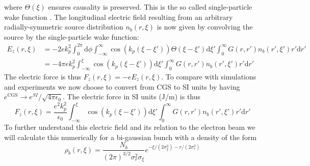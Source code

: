where $\Theta(\xi)$ ensures causality is preserved. This is the so called single-particle wake function \cite{Katsouleas1987}. The longitudinal electric field resulting from an arbitrary radially-symmetric source distribution $n_b(r,\xi)$ is now given by convolving the source by the single-particle wake function:
\begin{align}
E_z(r,\xi)&=-2ek_p^2\int_0^{2\pi}\mathrm{d}\phi  \int_{-\infty}^{\infty} \cos(k_p(\xi-\xi'))\Theta(\xi-\xi')\mathrm{d}\xi' \int_{0}^{\infty}G\left(r,r'\right) n_b(r',\xi')r'\mathrm{d}r'\\
&=-4\pi e k_p^2 \int_{-\infty}^{\xi} \cos(k_p(\xi-\xi'))\mathrm{d}\xi' \int_{0}^{\infty}G\left(r,r'\right) n_b(r',\xi')r'\mathrm{d}r'
\end{align}
The electric force is thus $F_z(r,\xi)=-eE_z(r,\xi)$. To compare with simulations and experiments we now choose to convert from CGS to SI units by having $e^{\text{CGS}}\to e^{SI}/\sqrt{4\pi\epsilon_0}$. The electric force in SI units (J/m) is thus
\begin{equation}
F_z(r,\xi)=\frac{e^2 k_p^2}{\epsilon_0} \int_{-\infty}^{\xi} \cos(k_p(\xi-\xi'))\mathrm{d}\xi' \int_{0}^{\infty}G\left(r,r'\right) n_b(r',\xi')r'\mathrm{d}r'
\label{longitudinalforce}
\end{equation}
To further understand this electric field and its relation to the electron beam we will calculate this numerically for a bi-gaussian bunch with a density of the form
\begin{equation}
\rho_b(r,\xi)=\frac{N_b}{(2\pi)^{3/2}\sigma_r^2\sigma_{\xi}}e^{-\xi/(2\sigma_{\xi}^2)-r/(2\sigma_{r}^2)}
\label{bigaussian}
\end{equation}
